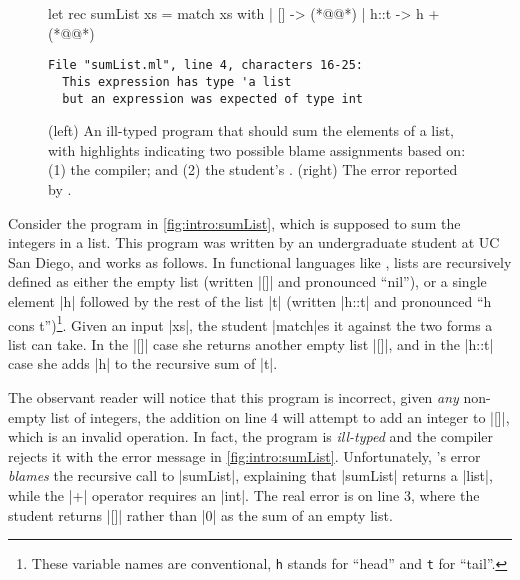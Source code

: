 \begin{figure}[t]
\small
\begin{minipage}{0.45\linewidth}
\begin{ecode}
let rec sumList xs =
  match xs with
  | []   -> (*@\hlSherrloc{[]}@*)
  | h::t -> h + (*@@*)
\end{ecode}
\end{minipage}
\begin{minipage}{0.49\linewidth}
\begin{verbatim}
File "sumList.ml", line 4, characters 16-25:
  This expression has type 'a list
  but an expression was expected of type int

\end{verbatim}
\end{minipage}
\caption{(left) An ill-typed \ocaml program that should sum the elements of a
  list, with highlights indicating two possible blame assignments based on:
  (1) the \hlTree{\ocaml} compiler; and
  (2) the student's .
  (right) The error reported by \ocaml.}
\label{fig:intro:sumList}
\end{figure}

Consider the \ocaml program in \autoref{fig:intro:sumList}, which is
supposed to sum the integers in a list.
%
This program was written by an undergraduate student at UC San Diego,
and works as follows.
%
In functional languages like \ocaml, lists are recursively defined as
either the empty list (written |[]| and pronounced ``nil''), or a single
element |h| followed by the rest of the list |t| (written |h::t| and
pronounced ``h cons t'')\footnote{These variable names are conventional,
  \texttt{h} stands for ``head'' and \texttt{t} for ``tail''.}.
%
Given an input |xs|, the student |match|es it against the
two forms a list can take.
%
In the |[]| case she returns another empty list |[]|, and in the
|h::t| case she adds |h| to the recursive sum of |t|.

The observant reader will notice that this program is incorrect, given
\emph{any} non-empty list of integers, the addition on line 4 will
attempt to add an integer to |[]|, which is an invalid operation.
%
In fact, the program is \emph{ill-typed} and the \ocaml compiler rejects
it with the error message in \autoref{fig:intro:sumList}.
%
Unfortunately, \ocaml's error \emph{blames} the recursive call to
|sumList|, explaining that |sumList| returns a |list|, while the |+|
operator requires an |int|.
%
The real error is on line 3, where the student returns |[]| rather than
|0| as the sum of an empty list.

